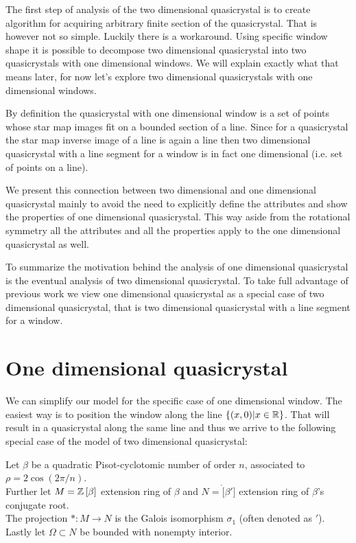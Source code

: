 \documentclass[text.tex]{subfiles}
\begin{document}
The first step of analysis of the two dimensional quasicrystal is to create algorithm for acquiring arbitrary finite section of the quasicrystal. That is however not so simple. Luckily there is a workaround. Using specific window shape it is possible to decompose two dimensional quasicrystal into two quasicrystals with one dimensional windows. We will explain exactly what that means later, for now let's explore two dimensional quasicrystals with one dimensional windows. 

By definition the quasicrystal with one dimensional window is a set of points whose star map images fit on a bounded section of a line. Since for a quasicrystal the star map inverse image of a line is again a line then two dimensional quasicrystal with a line segment for a window is in fact one dimensional (i.e. set of points on a line). 

We present this connection between two dimensional and one dimensional quasicrystal mainly to avoid the need to explicitly define the attributes and show the properties of one dimensional quasicrystal. This way aside from the rotational symmetry all the attributes and all the properties apply to the one dimensional quasicrystal as well. 

To summarize the motivation behind the analysis of one dimensional quasicrystal is the eventual analysis of two dimensional quasicrystal. To take full advantage of previous work we view one dimensional quasicrystal as a special case of two dimensional quasicrystal, that is two dimensional quasicrystal with a line segment for a window. 

\section{One dimensional quasicrystal}
We can simplify our model for the specific case of one dimensional window. The easiest way is to position the window along the line $\{(x,0)|x\in\mathbb{R}\}$. That will result in a quasicrystal along the same line and thus we arrive to the following special case of the model of two dimensional quasicrystal: 

Let $\beta$ be a quadratic Pisot-cyclotomic number of order $n$, associated to $\rho = 2\cos\left(2\pi/n\right)$. \\
Further let $M = \mathbb{Z}\left[\beta\right]$ extension ring of $\beta$ and $N = \ring[\beta']$ extension ring of $\beta$'s conjugate root. \\
The projection $\ast:M\rightarrow N$ is the Galois isomorphism $\sigma_1$ (often denoted as $'$). \\
Lastly let $\Omega\subset N$ be bounded with nonempty interior. 
\end{document}
